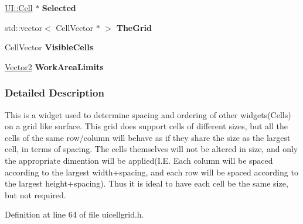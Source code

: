 \begin{DoxyCompactItemize}
\item 
\hypertarget{classMezzanine_1_1UI_1_1CellGrid_a143c718a254713b1fd2ee42d5396d3cf}{
\hyperlink{classMezzanine_1_1UI_1_1Cell}{UI::Cell} $\ast$ {\bfseries Selected}}
\label{classMezzanine_1_1UI_1_1CellGrid_a143c718a254713b1fd2ee42d5396d3cf}

\item 
\hypertarget{classMezzanine_1_1UI_1_1CellGrid_aeac02021fe4dab087f7f4ee793b67efa}{
std::vector$<$ CellVector $\ast$ $>$ {\bfseries TheGrid}}
\label{classMezzanine_1_1UI_1_1CellGrid_aeac02021fe4dab087f7f4ee793b67efa}

\item 
\hypertarget{classMezzanine_1_1UI_1_1CellGrid_a6047973c97d0d9c9be3aa0d7acb6d4f9}{
CellVector {\bfseries VisibleCells}}
\label{classMezzanine_1_1UI_1_1CellGrid_a6047973c97d0d9c9be3aa0d7acb6d4f9}

\item 
\hypertarget{classMezzanine_1_1UI_1_1CellGrid_a11892c8fb854bcc546484c82bde88633}{
\hyperlink{classMezzanine_1_1Vector2}{Vector2} {\bfseries WorkAreaLimits}}
\label{classMezzanine_1_1UI_1_1CellGrid_a11892c8fb854bcc546484c82bde88633}

\end{DoxyCompactItemize}


\subsubsection{Detailed Description}
This is a widget used to determine spacing and ordering of other widgets(Cells) on a grid like surface. This grid does support cells of different sizes, but all the cells of the same row/column will behave as if they share the size as the largest cell, in terms of spacing. The cells themselves will not be altered in size, and only the appropriate dimention will be applied(I.E. Each column will be spaced according to the largest width+spacing, and each row will be spaced according to the largest height+spacing). Thus it is ideal to have each cell be the same size, but not required. 

Definition at line 64 of file uicellgrid.h.




